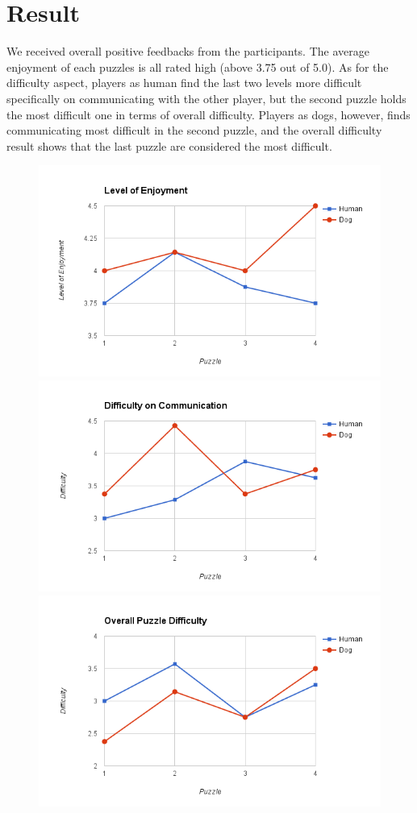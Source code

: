 \documentclass{sigchi}
\begin{document}
\section{Result}
We received overall positive feedbacks from the participants. The average enjoyment of each puzzles is all rated high (above 3.75 out of 5.0). As for the difficulty aspect, players as human find the last two levels more difficult specifically on communicating with the other player, but the second puzzle holds the most difficult one in terms of overall difficulty. Players as dogs, however, finds communicating most difficult in the second puzzle, and the overall difficulty result shows that the last puzzle are considered the most difficult.
\begin{figure}[h]
\centering
\includegraphics[width=0.9\linewidth]{images/enjoyment.png}
\includegraphics[width=0.9\linewidth]{images/communication_difficulty.png}
\includegraphics[width=0.9\linewidth]{images/overall_difficulty.png}
\end{figure}
\end{document}
